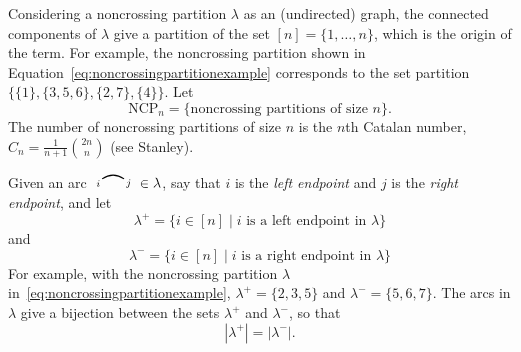 \documentclass[12pt]{article}
\theoremstyle{definition}
\theoremstyle{remark}
\numberwithin{equation}{section}
\newcommand{\NCP}{\mathrm{NCP}}
\newcommand{\edge}[2]{\tikz[scale = 0.75, baseline = -0.2cm]{
\draw (0.1, 0) node[inner sep = 0ex] (a) {};
\node[left, xshift = 0.1cm, yshift = -0.1cm] at (a) {$\scriptstyle #1$};
\draw (0.9, 0)  node[inner sep = 0ex] (b) {};
\node[right, xshift = -0.1cm, yshift = -0.1cm] at (b) {$\scriptstyle #2$};
\draw[thick] (a) to[out = 35, in = 145] (b);}}
\begin{document}
Considering a noncrossing partition $\lambda$ as an (undirected) graph, the connected components of $\lambda$ give a partition of the set $[n] = \{1, \ldots, n\}$, which is the origin of the term.  For example, the noncrossing partition shown in Equation~\eqref{eq:noncrossingpartitionexample} corresponds to the set partition $\{ \{1\}, \{3, 5, 6\}, \{2, 7\}, \{4\}  \}$.  Let
\[
\NCP_{n} = \{ \text{noncrossing partitions of size $n$} \}.
\]
The number of noncrossing partitions of size $n$ is the $n$th Catalan number, $C_{n} = \frac{1}{n+1}\binom{2n}{n}$ (see Stanley).

Given an arc $ \edge{i}{j} \in \lambda$, say that $i$ is the \emph{left endpoint} and $j$ is the \emph{right endpoint}, and let
\[
\lambda^{+} = \{ i \in [n] \;|\; \text{$i$ is a left endpoint in $\lambda$} \}
\]
and
\[
\lambda^{-} = \{ i \in [n] \;|\; \text{$i$ is a right endpoint in $\lambda$} \}
\]
For example, with the noncrossing partition $\lambda$ in~\eqref{eq:noncrossingpartitionexample}, $\lambda^{+} = \{2, 3, 5\}$ and $\lambda^{-} = \{5, 6, 7\}$.  The arcs in $\lambda$ give a bijection between the sets $\lambda^{+}$ and $\lambda^{-}$, so that
\[
|\lambda^{+}| = |\lambda^{-}|.
\]
\end{document}
